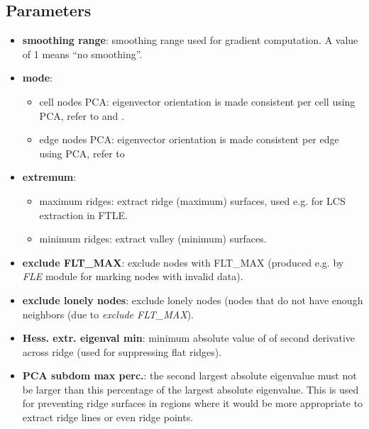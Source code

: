 \subsection{Parameters}
\begin{itemize}

\item
  \textbf{smoothing range}: smoothing range used for gradient computation. A value of 1 means ``no smoothing''.

\item
  \textbf{mode}:
  \begin{itemize}
  \item
    cell nodes PCA: eigenvector orientation is made consistent per cell using PCA, refer to \cite{Furst2001Ridges} and \cite{Sadlo07ARidges}.
  \item
    edge nodes PCA: eigenvector orientation is made consistent per edge using PCA, refer to \cite{Sadlo07ARidges}
  \end{itemize}

\item
  \textbf{extremum}:
  \begin{itemize}
  \item
    maximum ridges: extract ridge (maximum) surfaces, used e.g. for LCS extraction in FTLE.
  \item
    minimum ridges: extract valley (minimum) surfaces.
  \end{itemize}

\item
  \textbf{exclude FLT\_MAX}: exclude nodes with FLT\_MAX (produced e.g. by \emph{FLE} module for marking nodes with invalid data).

\item
  \textbf{exclude lonely nodes}: exclude lonely nodes (nodes that do not have enough neighbors (due to \emph{exclude FLT\_MAX}).

\item
  \textbf{Hess. extr. eigenval min}: minimum absolute value of of second derivative across ridge (used for suppressing flat ridges).

\item
  \textbf{PCA subdom max perc.}: the second largest absolute eigenvalue must not be larger than this percentage of the largest absolute eigenvalue. This is used for preventing ridge surfaces in regions where it would be more appropriate to extract ridge lines or even ridge points.


\end{itemize}
